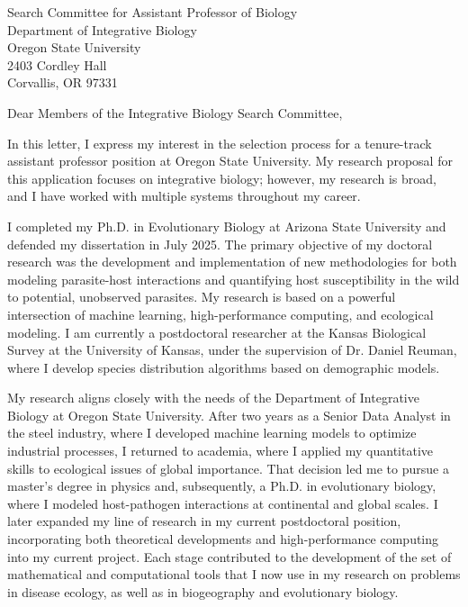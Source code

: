 \documentclass[11pt,letterpaper]{letter}  %
\date{September 1 2026}
\begin{document}
\begin{letter}{
Search Committee for Assistant Professor of Biology\\
Department of Integrative Biology\\
Oregon State University\\
2403 Cordley Hall\\
Corvallis, OR 97331
}


\opening{Dear Members of the Integrative Biology Search Committee,}

In this letter, I express my interest in the selection process for a tenure-track assistant professor position  at Oregon State University. My research proposal for this application focuses on integrative biology; however, my research is broad, and I have worked with multiple systems throughout my career.

I completed my Ph.D. in Evolutionary Biology at Arizona State University and defended my dissertation in July 2025. The primary objective of my doctoral research was the development and implementation of new methodologies for both modeling parasite-host interactions and quantifying host susceptibility in the wild to potential, unobserved parasites. My research is based on a powerful intersection of machine learning, high-performance computing, and ecological modeling. I am currently a postdoctoral researcher at the Kansas Biological Survey at the University of Kansas, under the supervision of Dr. Daniel Reuman, where I develop species distribution algorithms based on demographic models.

My research aligns closely with the needs of the Department of Integrative Biology at Oregon State University. After two years as a Senior Data Analyst in the steel industry, where I developed machine learning models to optimize industrial processes, I returned to academia, where I applied my quantitative skills to ecological issues of global importance. That decision led me to pursue a master's degree in physics and, subsequently, a Ph.D. in evolutionary biology, where I modeled host-pathogen interactions at continental and global scales. I later expanded my line of research in my current postdoctoral position, incorporating both theoretical developments and high-performance computing into my current project. Each stage contributed to the development of the set of mathematical and computational tools that I now use in my research on problems in disease ecology, as well as in biogeography and evolutionary biology.


\end{letter}
\end{document}
